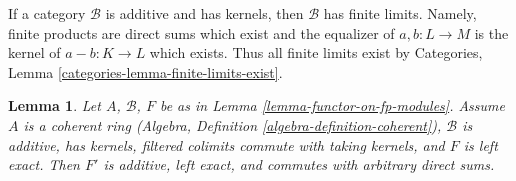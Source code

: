 \documentclass{stacks-project}
\theoremstyle{plain}
\newtheorem{lemma}[subsection]{Lemma}
\theoremstyle{definition}
\theoremstyle{remark}
\numberwithin{equation}{subsection}
\begin{document}
\noindent
If a category $\mathcal{B}$ is additive and has kernels,
then $\mathcal{B}$ has finite limits. Namely, finite products
are direct sums which exist and the equalizer of $a, b : L \to M$
is the kernel of $a - b : K \to L$ which exists. Thus all finite
limits exist by Categories, Lemma \ref{categories-lemma-finite-limits-exist}.

\begin{lemma}
\label{lemma-functor-on-fp-modules-left-exact}
Let $A$, $\mathcal{B}$, $F$ be as in Lemma \ref{lemma-functor-on-fp-modules}.
Assume $A$ is a coherent ring (Algebra, Definition
\ref{algebra-definition-coherent}), $\mathcal{B}$ is additive, has kernels,
filtered colimits commute with taking kernels, and $F$ is left exact. Then
$F'$ is additive, left exact, and commutes with arbitrary direct sums.
\end{lemma}
\end{document}
